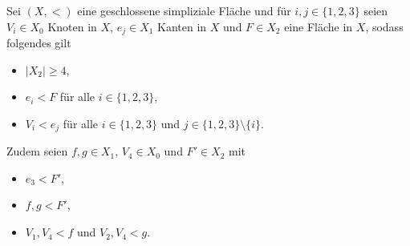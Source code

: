 \documentclass{beamer}
\begin{document}
\begin{frame}
Sei $(X,<)$ eine geschlossene simpliziale Fläche und für $i,j\in \{1,2,3\}$ seien $V_i \in X_0$ Knoten in $X$, $e_j \in X_1$ Kanten in $X$ und $F\in X_2$ eine Fläche in $X$, sodass folgendes gilt\pause 
\begin{itemize}
 \item $\vert X_{2}\vert \geq 4$,\pause
 \item $e_{i} < F$ für alle $i \in \{1,2,3\}$,\pause
 \item $V_{i}<e_{j}$ für alle $i \in \{1,2,3\}$ und $j \in \{1,2,3\} \setminus\{i\}$.
 \end{itemize}
 Zudem seien $f,g\in X_1$, $V_4\in X_0$ und $F'\in X_2$ mit\pause
\begin{itemize}
\item $e_3<F'$,\pause
\item $f,g <F'$, \pause
\item $V_1,V_4<f$ und $V_2,V_4<g$.
\end{itemize}
\end{frame}  
\end{document}
